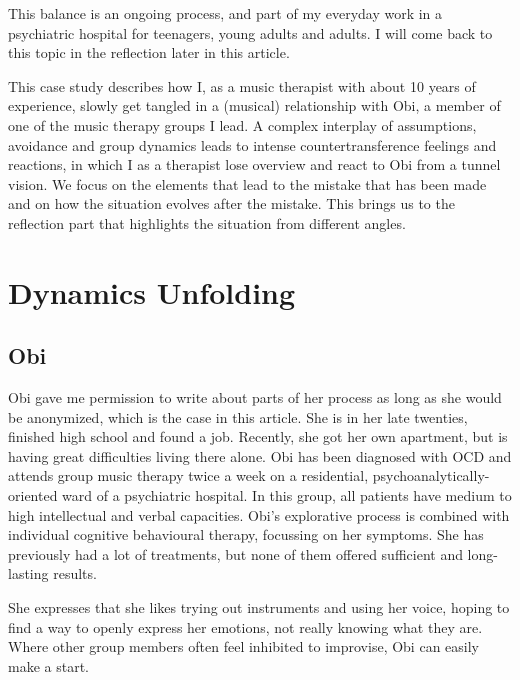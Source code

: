 \documentclass[authordate, empirical, issue]{jote-new-article}
\begin{document}
This balance is an ongoing process, and part of my everyday work in a psychiatric hospital for teenagers, young adults and adults. I will come back to this topic in the reflection later in this article.



This case study describes how I, as a music therapist with about 10 years of experience, slowly get tangled in a (musical) relationship with Obi, a member of one of the music therapy groups I lead. A complex interplay of assumptions, avoidance and group dynamics leads to intense countertransference feelings and reactions, in which I as a therapist lose overview and react to Obi from a tunnel vision. We focus on the elements that lead to the mistake that has been made and on how the situation evolves after the mistake. This brings us to the reflection part that highlights the situation from different angles.







\section{Dynamics Unfolding}



\subsection{Obi}
Obi gave me permission to write about parts of her process as long as she would be anonymized, which is the case in this article. She is in her late twenties, finished high school and found a job. Recently, she got her own apartment, but is having great difficulties living there alone. Obi has been diagnosed with OCD and attends group music therapy twice a week on a residential, psychoanalytically-oriented ward of a psychiatric hospital. In this group, all patients have medium to high intellectual and verbal capacities. Obi's explorative process is combined with individual cognitive behavioural therapy, focussing on her symptoms. She has previously had a lot of treatments, but none of them offered sufficient and long-lasting results.



She expresses that she likes trying out instruments and using her voice, hoping to find a way to openly express her emotions, not really knowing what they are. Where other group members often feel inhibited to improvise, Obi can easily make a start.
\end{document}

